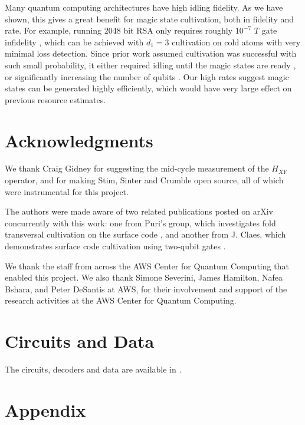 \documentclass[twocolumn,notitlepage,nofootinbib,floatfix,superscriptaddress]{revtex4-1}
\begin{document}
Many quantum computing architectures have high idling fidelity. As we have shown, this gives a great benefit for magic state cultivation, both in fidelity and rate. For example, running 2048 bit RSA only requires roughly $10^{-7}$ $T$ gate infidelity \cite{gidney2025factor,zhou2025resource}, which can be achieved with $d_1=3$ cultivation on cold atoms with very minimal loss detection. Since prior work assumed cultivation was successful with such small probability, it either required idling until the magic states are ready \cite{gidney2025factor}, or significantly increasing the number of qubits \cite{zhou2025resource}. Our high rates suggest magic states can be generated highly efficiently, which would have very large effect on previous resource estimates. 

\section{Acknowledgments}
We thank Craig Gidney for suggesting the mid-cycle measurement of the $H_{XY}$ operator, and for making Stim, Sinter and Crumble \cite{gidney2021stim} open source, all of which were instrumental for this project.

The authors were made aware of two related publications posted on arXiv concurrently with this work: one from Puri’s group, which investigates fold transversal cultivation on the surface code \cite{sahay2025fold}, and another from J. Claes, which demonstrates surface code cultivation using two-qubit gates \cite{claes2025cultivating}.

We thank the staff from across the AWS Center for
Quantum Computing that enabled this project. We also
thank Simone Severini, James Hamilton, Nafea Bshara, and Peter DeSantis at AWS, for their involvement and support of the research
activities at the AWS Center for Quantum Computing.

\section{Circuits and Data}

The circuits, decoders and data are available in \cite{vaknin2025github}.



\clearpage

\appendix
\section*{Appendix}
\end{document}

